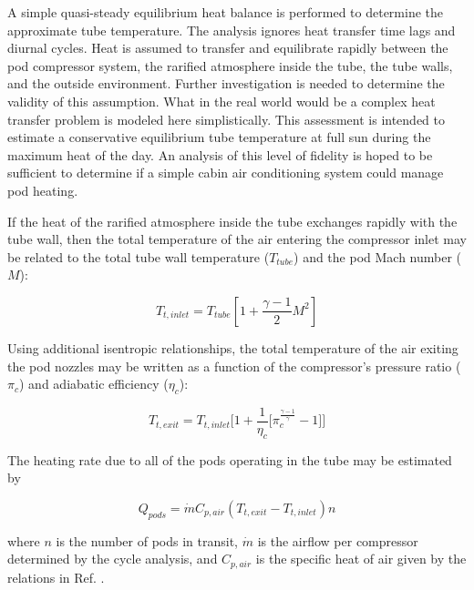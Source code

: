 \documentclass[heading.tex]{subfiles}
\begin{document}
A simple quasi-steady equilibrium heat balance
is performed to determine the approximate tube temperature.
The analysis ignores heat transfer time lags and diurnal cycles.
Heat is assumed to transfer and equilibrate rapidly between the pod compressor system,
the rarified atmosphere inside the tube, the tube walls, and the outside environment.
Further investigation is needed to determine the validity of this assumption.
What in the real world would be a complex heat transfer problem
is modeled here simplistically.
This assessment is intended to estimate a conservative
equilibrium tube temperature at full sun during the maximum heat of the day.
An analysis of this level of fidelity is hoped to be sufficient to determine if a
simple cabin air conditioning system could manage pod heating.

If the heat of the rarified atmosphere inside the tube exchanges rapidly with the tube wall,
then the total temperature of the air entering the compressor inlet
may be related to the total tube wall temperature ($T_{tube}$) and the pod Mach number ($M$):

\begin{equation}
T_{t,inlet} = T_{tube} [1 + \frac{\gamma -1}{2} M^2]
\end{equation}

Using additional isentropic relationships,
the total temperature of the air exiting the pod nozzles may be written as a function
of the compressor's pressure ratio ($\pi_{c}$) and adiabatic efficiency ($\eta_{c}$):

\begin{equation}
T_{t,exit} = T_{t,inlet} \Bigg[ 1 + \frac{1}{\eta_{c}} \Big[ \pi_{c}^{\frac{\gamma-1}{\gamma}}- 1 \Big] \Bigg]
\end{equation}

The heating rate due to all of the pods operating in the tube may be estimated by

\begin{equation}
{Q}_{pods}= \dot{m} C_{p,air} (T_{t,exit} - T_{t,inlet}) n
\end{equation}

where $n$ is the number of pods in transit,
$\dot{m}$ is the airflow per compressor determined by the cycle analysis,
and $C_{p,air}$ is the specific heat of air given by the relations in Ref. . 
\end{document}
